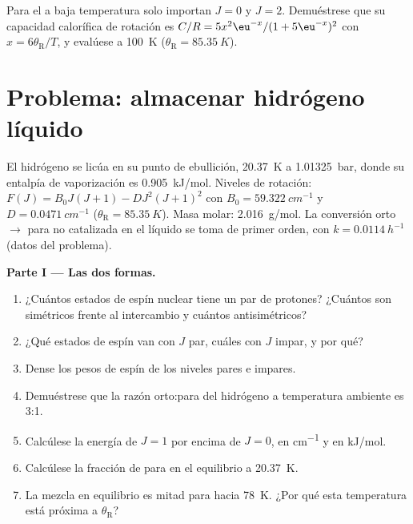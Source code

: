 \begin{exercise}[$\star\star\star$]\label{exo:b3:statistical-thermo-applied:12}
Para el  a baja temperatura solo importan $J = 0$ y $J = 2$. Demuéstrese que
su capacidad calorífica de rotación es $C/R = 5x^2\eu^{-x}/(1 + 5\eu^{-x})^2$ con $x = 6\theta_{\mathrm R}/T$, y
evalúese a \qty{100}{K} ($\theta_{\mathrm R} = \qty{85.35}{K}$).
\end{exercise}

\section{Problema: almacenar hidrógeno líquido}

\begin{problem}
\label{pb:b3:statistical-thermo-applied:1}
El hidrógeno se licúa en su punto de ebullición, \qty{20.37}{K} a \qty{1.01325}{bar}, donde su
entalpía de vaporización es \qty{0.905}{kJ/mol}. Niveles de rotación: $F(J) = B_0J(J+1) -
D J^2(J+1)^2$ con $B_0 = \qty{59.322}{cm^{-1}}$ y $D = \qty{0.0471}{cm^{-1}}$ ($\theta_{\mathrm R} = \qty{85.35}{K}$).
Masa molar: \qty{2.016}{g/mol}. La conversión orto $\to$ para no catalizada en el líquido
se toma de primer orden, con $k = \qty{0.0114}{h^{-1}}$ (datos del problema).

\medskip\noindent\textbf{Parte I --- Las dos formas.}
\begin{enumerate}
  \item ¿Cuántos estados de espín nuclear tiene un par de protones? ¿Cuántos son
        simétricos frente al intercambio y cuántos antisimétricos?
  \item ¿Qué estados de espín van con $J$ par, cuáles con $J$ impar, y por qué?
  \item Dense los pesos de espín de los niveles pares e impares.
  \item Demuéstrese que la razón orto:para del hidrógeno a temperatura ambiente es 3:1.
  \item Calcúlese la energía de $J = 1$ por encima de $J = 0$, en \unit{cm^{-1}} y en
        \unit{kJ/mol}.
  \item Calcúlese la fracción de para en el equilibrio a \qty{20.37}{K}.
  \item La mezcla en equilibrio es mitad para hacia \qty{78}{K}. ¿Por qué esta
        temperatura está próxima a $\theta_{\mathrm R}$?
\end{enumerate}


\end{problem}
